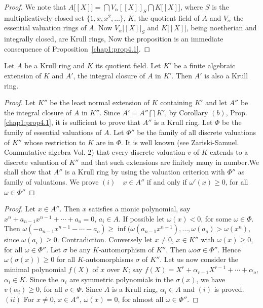 \begin{proof}
We note that $A \big[[X] \big] = \bigcap V_\alpha [[X]]_S \bigcap K
\big[[X]\big]$, 
where $S$ is the multiplicatively closed set $\big\{1, x, x^2, \ldots
\big\}$, $K$, the quotient field of $A$ and $V_{\alpha}$ the essential
valuation rings of $A$. Now $V_\alpha \big[[X]\big]_S$ and $K \big
[[X] \big]$, being noetherian and integrally closed, are Krull rings,
Now the proposition is an immediate consequence of 
Proposition~\ref{chap1:prop4.1}.  
\end{proof}  
  
\begin{prop}\label{chap1:prop4.5} %
 Let $A$ be a Krull ring and $K$ its quotient field. Let $K'$ be 
  a finite algebraic extension of $K$ and $A'$, the integral closure
  of $A$ in $K'$. Then $A'$ is also a Krull ring.  
\end{prop}  
  
\begin{proof}
Let $K''$ be the least normal extension of $K$ containing $K'$ and let
$A''$ be the integral closure of $A$ in $K''$. Since $A' = A'' \bigcap
K'$, by Corollary $(b)$, Prop. \ref{chap1:prop4.1}, it is sufficient
to prove that 
$A''$ is a  Krull ring. Let $\Phi$ be the family of essential
valuations of $A$. Let $\Phi''$ be the family of all discrete
valuations of $K''$ whose restriction to $K$ are in $\Phi$. It is well
known (see Zariski-Samuel. Commutative  algebra Vol. 2) that every
discrete valuation $v$ of $K$ extends to a discrete valuation of $K''$
and that such extensions are finitely many in number.\pageoriginale We
shall show that $A''$ is a Krull ring by using the valuation criterion
with $\Phi''$ as family of valuations. We prove $(i) \quad x \in A''$
if and only if $\omega' (x) \ge 0$, for all $\omega \in \Phi''$  
\end{proof}  
  
\begin{proof}
Let $x \in A''$. Then $x$ satisfies a monic polynomial, say $x^n +
a_{n-1} x^{n-1} + \cdots + a_o = 0$, $a_i \in A$. If possible let
$\omega(x) < 0$, for some $\omega \in \Phi$. Then $\omega (-a_{n-1}
x^{n-1} - \cdots - a_o) \ge \inf (\omega (a_{n - 1} x^{n-1}) , \ldots ,
\omega(a_o) > \omega(x^n)$, since $\omega(a_i) \ge
0$. Contradiction. Conversely let $x \neq 0$, $x \in K''$ with $\omega
(x) \ge 0$, for all $\omega \in \Phi''$. Let $\sigma$ be any
$K$-automorphism of $K''$. Then $\omega o \sigma \in \Phi''$. Hence
$\omega (\sigma (x)) \ge 0$ for all $K$-automorphisms $\sigma$ of
$K''$. Let us now consider the minimal polynomial $f(X)$ of $x$ over
$K$; say $f(X) = X^r + \alpha_{r - 1} X^{r-1} + \cdots + \alpha_o$, $\alpha_i
\in K$. Since the $\alpha_i$ are symmetric polynomials in the $\sigma
(x)$, we have $v(\alpha_i) \ge 0$, for all $v \in \Phi$. Since $A$ is
a Krull ring, $\alpha_i \in A$ and $(i)$ is proved. $(ii)$ For $x \neq
0$, $x \in A''$, $\omega (x) = 0$, for almost all $\omega \in \Phi''$. 
\end{proof}  
  
